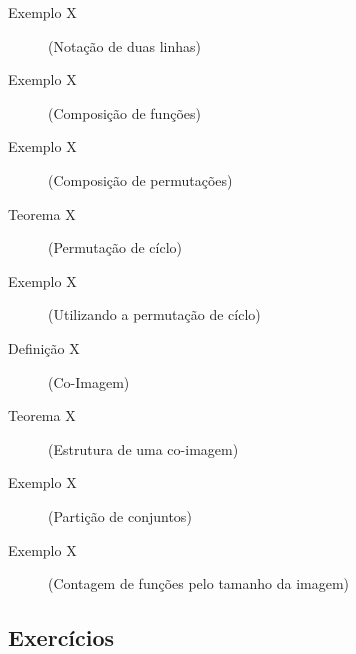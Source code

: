 \begin{description}
	\item[Exemplo X] (Notação de duas linhas)
\end{description}

\begin{description}
	\item[Exemplo X] (Composição de funções)
\end{description}

\begin{description}
	\item[Exemplo X] (Composição de permutações)
\end{description}

\begin{description}
	\item[Teorema X] (Permutação de cíclo)
\end{description}

\begin{description}
	\item[Exemplo X] (Utilizando a permutação de cíclo)
\end{description}

\begin{description}
	\item[Definição X] (Co-Imagem)
\end{description}

\begin{description}
	\item[Teorema X] (Estrutura de uma co-imagem)
\end{description}

\begin{description}
	\item[Exemplo X] (Partição de conjuntos)
\end{description}

\begin{description}
	\item[Exemplo X] (Contagem de funções pelo tamanho da imagem)
\end{description}

\subsection{Exercícios}
